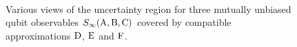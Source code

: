 \begin{figure}[H]
  \centering
  \\
  \caption{Various views of the uncertainty region for three mutually unbiased qubit observables $S_\infty(\operatorname{A},\operatorname{B},\operatorname{C})$ covered by compatible approximations $\operatorname{D}$, $\operatorname{E}$ and $\operatorname{F}$.}\label{fig:qubit-triple-meas-ur-full}
\end{figure}

